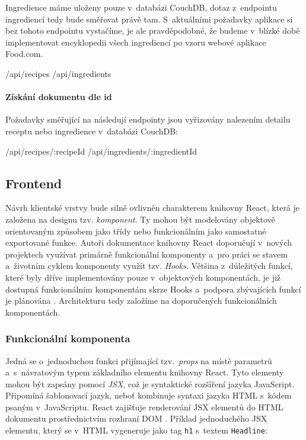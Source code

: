 Ingredience máme uloženy pouze v~databázi CouchDB, dotaz z~endpointu ingrediencí tedy bude směřovat právě tam. S~aktuálními požadavky aplikace si bez tohoto endpointu vystačíme, je ale pravděpodobné, že budeme v~blízké době implementovat encyklopedii všech ingrediencí po vzoru webové aplikace Food.com.

\begin{code}
/api/recipes
/api/ingredients
\end{code}

\paragraph{Získání dokumentu dle id}

Požadavky směřující na následují endpointy jsou vyřizovány nalezením detailu receptu nebo ingredience v~databázi CouchDB:

\begin{code}
/api/recipes/:recipeId
/api/ingredients/:ingredientId
\end{code}

\subsection{Frontend}

Návrh klientské vrstvy bude silně ovlivněn charakterem knihovny React, která je založena na designu tzv. \emph{komponent}. Ty mohou být modelovány objektově orientovaným způsobem jako třídy nebo funkcionálním jako samostatné exportované funkce. Autoři dokumentace knihovny React doporučují v~nových projektech využívat primárně funkcionální komponenty a~pro práci se stavem a~životním cyklem komponenty využít tzv. \emph{Hooks}. Většina z~důležitých funkcí, které byly dříve implementovány pouze v~objektových komponentách, je již dostupná funkcionálním komponentám skrze Hooks a~podpora zbývajících funkcí je plánována \citep{class-or-functional}. Architekturu tedy založíme na doporučených funkcionálních komponentách.

\subsubsection{Funkcionální komponenta}

Jedná se o~jednoduchou funkci přijímající tzv.~\emph{props} na místě parametrů a~s~návratovým typem základního elementu knihovny React. Tyto elementy mohou být zapsány pomocí \emph{JSX}, což je syntaktické rozšíření jazyka JavaScript. Připomíná šablonovací jazyk, neboť kombinuje syntaxi jazyka HTML s~kódem psaným v~JavaScriptu. React zajišťuje renderování JSX elementů do HTML dokumentu prostřednictvím rozhraní DOM \citep{jsx-intro}. Příklad jednoduchého JSX elementu, který se v~HTML vygeneruje jako tag \texttt{h1} s~textem \texttt{Headline}:


